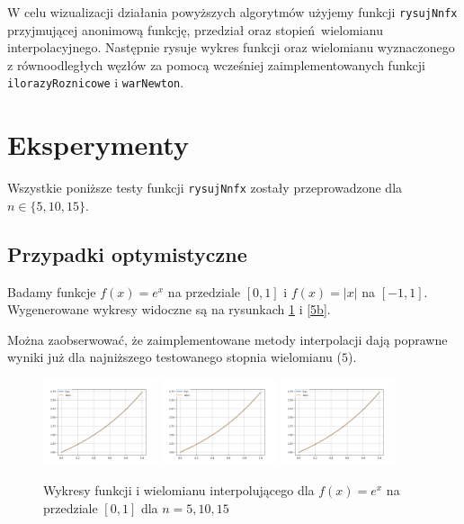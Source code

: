 \documentclass{article}
\begin{document}
W celu wizualizacji działania powyższych algorytmów użyjemy funkcji \texttt{rysujNnfx} przyjmującej anonimową funkcję, przedział oraz stopień wielomianu interpolacyjnego.
Następnie rysuje wykres funkcji oraz wielomianu wyznaczonego z równoodległych węzłów za pomocą wcześniej zaimplementowanych funkcji \texttt{ilorazyRoznicowe} i \texttt{warNewton}.


\section{Eksperymenty}

Wszystkie poniższe testy funkcji \texttt{rysujNnfx} zostały przeprowadzone dla $n \in \{5,10,15\}$.

\subsection{Przypadki optymistyczne}

Badamy funkcje $f(x) = e^x$ na przedziale $[0,1]$ i $f(x) = |x|$ na $[-1,1]$.
Wygenerowane wykresy widoczne są na rysunkach \ref{5a} i \ref{5b}.

Można zaobserwować, że zaimplementowane metody interpolacji dają poprawne wyniki już dla najniższego testowanego stopnia wielomianu ($5$).

\begin{figure}
\includegraphics[width=0.3\textwidth]{plots/5a_5.png}
\includegraphics[width=0.3\textwidth]{plots/5a_10.png}
\includegraphics[width=0.3\textwidth]{plots/5a_15.png}
\caption{Wykresy funkcji i wielomianu interpolującego dla $f(x) = e^x$ na przedziale $[0,1]$ dla $n=5,10,15$}
\label{5a}
\end{figure}
\end{document}
